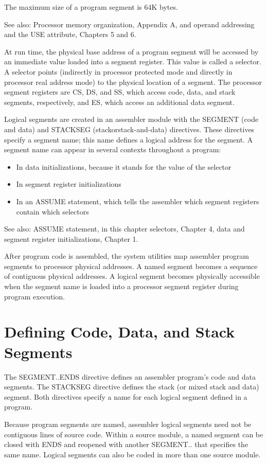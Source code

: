 The maximum size of a program segment is 64K bytes.

See also: Processor memory organization, Appendix A, and operand addressing and the USE attribute, Chapters 5 and 6.

At run time, the physical base address of a program segment will be accessed by an immediate value loaded into a segment register. This value is called a selector. A selector points (indirectly in processor protected mode and directly in processor real address mode) to the physical location of a segment. The processor segment registers are CS, DS, and SS, which access code, data, and stack segments, respectively, and ES, which access an additional data segment.

Logical segments are created in an assembler module with the SEGMENT (code and data) and STACKSEG (stackorstack-and-data) directives. These directives specify a segment name; this name defines a logical address for the segment. A segment name can appear in several contexts throughout a program:

\begin{itemize}
\item In data initializations, because it stands for the value of the selector
\item In segment register initializations
\item In an ASSUME statement, which tells the assembler which segment registers contain which selectors
\end{itemize}
See also: ASSUME statement, in this chapter selectors, Chapter 4, data and segment register initializations, Chapter 1.

After program code is assembled, the system utilities map assembler program segments to processor physical addresses. A named segment becomes a sequence of contiguous physical addresses. A logical segment becomes physically accessible when the segment name is loaded into a processor segment register during program execution.

\section*{Defining Code, Data, and Stack Segments}
The SEGMENT..ENDS directive defines an assembler program's code and data segments. The STACKSEG directive defines the stack (or mixed stack and data) segment. Both directives specify a name for each logical segment defined in a program.

Because program segments are named, assembler logical segments need not be contiguous lines of source code. Within a source module, a named segment can be closed with ENDS and reopened with another SEGMENT.. that specifies the same name. Logical segments can also be coded in more than one source module.

